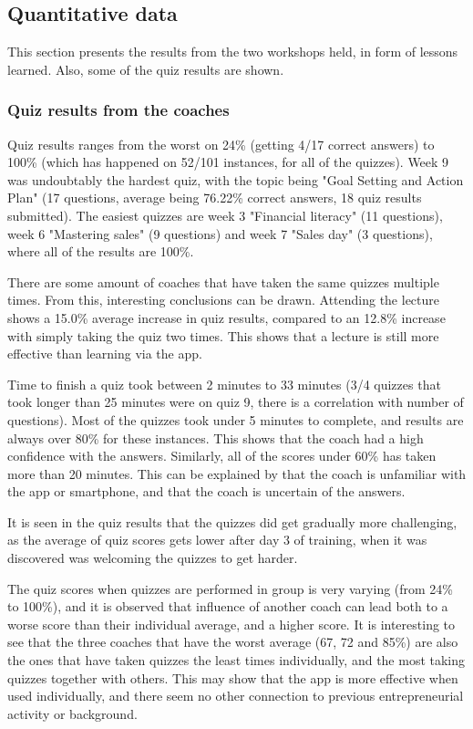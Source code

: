 \subsection{Quantitative data}


    This section presents the results from the two workshops held, in form of lessons learned. Also, some of the quiz results are shown.

    \subsubsection{Quiz results from the coaches}

    Quiz results ranges from the worst on 24\% (getting 4/17 correct answers) to 100\% (which has happened on 52/101 instances, for all of the quizzes). Week 9 was undoubtably the hardest quiz, with the topic being "Goal Setting and Action Plan" (17 questions, average being 76.22\% correct answers, 18 quiz results submitted). The easiest quizzes are week 3 "Financial literacy" (11 questions), week 6 "Mastering sales" (9 questions) and week 7 "Sales day" (3 questions), where all of the results are 100\%.

    There are some amount of coaches that have taken the same quizzes multiple times. From this, interesting conclusions can be drawn. Attending the lecture shows a 15.0\% average increase in quiz results, compared to an 12.8\% increase with simply taking the quiz two times. This shows that a lecture is still more effective than learning via the app.

    Time to finish a quiz took between 2 minutes to 33 minutes (3/4 quizzes that took longer than 25 minutes were on quiz 9, there is a correlation with number of questions). Most of the quizzes took under 5 minutes to complete, and results are always over 80\% for these instances. This shows that the coach had a high confidence with the answers. Similarly, all of the scores under 60\% has taken more than 20 minutes. This can be explained by that the coach is unfamiliar with the app or smartphone, and that the coach is uncertain of the answers.

    It is seen in the quiz results that the quizzes did get gradually more challenging, as the average of quiz scores gets lower after day 3 of training, when it was discovered was welcoming the quizzes to get harder.

    The quiz scores when quizzes are performed in group is very varying (from 24\% to 100\%), and it is observed that influence of another coach can lead both to a worse score than their individual average, and a higher score. It is interesting to see that the three coaches that have the worst average (67, 72 and 85\%) are also the ones that have taken quizzes the least times individually, and the most taking quizzes together with others. This may show that the app is more effective when used individually, and there seem no other connection to previous entrepreneurial activity or background.

